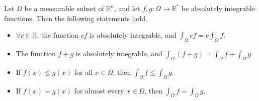 \begin{proposition}
    Let \(\Omega \) be a measurable subset of \(\mathbb{R} ^n\), and let \(f, g: \Omega \to \mathbb{R} ^*\) be absolutely integrable functions. Then the following statements hold. 
    \begin{itemize}
        \item [(a)] \(\forall c \in \mathbb{R}\), the function \(cf\) is absolutely integrable, and \(\int _\Omega cf = c \int _\Omega f\). 
        \item [(b)] The function \(f + g\) is absolutely integrable, and \(\int _\Omega (f + g) = \int _\Omega f + \int _\Omega g\).
        \item [(c)] If \(f(x) \le g(x)\) for all \(x \in \Omega\), then \(\int _\Omega f \le \int _\Omega g\). 
        \item [(d)] If \(f(x) = g(x)\) for almost every \(x \in \Omega\), then \(\int _\Omega f = \int _\Omega g\).         
    \end{itemize}   
\end{proposition}

